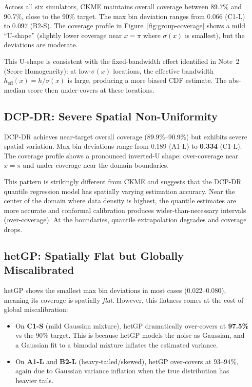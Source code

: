 \documentclass[11pt]{article}
\theoremstyle{remark}
\begin{document}
Across all six simulators, CKME maintains overall coverage between
89.7\% and 90.7\%, close to the 90\% target. The max bin deviation
ranges from 0.066 (C1-L) to 0.097 (B2-S). The coverage profile in
Figure~\ref{fig:group-coverage} shows a mild ``U-shape'' (slightly
lower coverage near $x = \pi$ where $\sigma(x)$ is smallest), but
the deviations are moderate.

This U-shape is consistent with the fixed-bandwidth effect identified
in Note~2 (Score Homogeneity): at low-$\sigma(x)$ locations, the
effective bandwidth $h_{\mathrm{eff}}(x) = h/\sigma(x)$ is large,
producing a more biased CDF estimate. The abs-median score then
under-covers at these locations.

\subsection{DCP-DR: Severe Spatial Non-Uniformity}

DCP-DR achieves near-target overall coverage (89.9\%--90.9\%) but
exhibits severe spatial variation. Max bin deviations range from
0.189 (A1-L) to \textbf{0.334} (C1-L). The coverage profile shows
a pronounced inverted-U shape: over-coverage near $x=\pi$ and
under-coverage near the domain boundaries.

This pattern is strikingly different from CKME and suggests that the
DCP-DR quantile regression model has spatially varying estimation
accuracy. Near the center of the domain where data density is highest,
the quantile estimates are more accurate and conformal calibration
produces wider-than-necessary intervals (over-coverage). At the
boundaries, quantile extrapolation degrades and coverage drops.

\subsection{hetGP: Spatially Flat but Globally Miscalibrated}

hetGP shows the smallest max bin deviations in most cases (0.022--0.080),
meaning its coverage is spatially \emph{flat}. However, this flatness
comes at the cost of global miscalibration:

\begin{itemize}
  \item On \textbf{C1-S} (mild Gaussian mixture), hetGP dramatically
    over-covers at \textbf{97.5\%} vs the 90\% target. This is because
    hetGP models the noise as Gaussian, and a Gaussian fit to a
    bimodal mixture inflates the estimated variance.
  \item On \textbf{A1-L} and \textbf{B2-L} (heavy-tailed/skewed),
    hetGP over-covers at 93--94\%, again due to Gaussian variance
    inflation when the true distribution has heavier tails.
\end{itemize}
\end{document}
